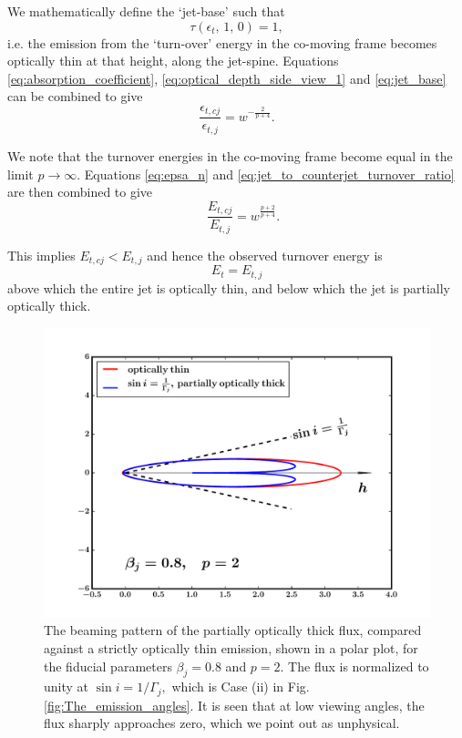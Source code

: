 We mathematically define the `jet-base' such that
\begin{equation}
\tau\left( \epsilon_{t}, \, 1, \, 0 \right) = 1, \label{eq:jet_base}
\end{equation}
i.e. the emission from the `turn-over' energy in the co-moving frame becomes optically thin at that height, along the jet-spine. Equations \ref{eq:absorption_coefficient}, \ref{eq:optical_depth_side_view_1} and \ref{eq:jet_base} can be combined to give
\begin{equation}
\frac{\epsilon_{t,cj}}{\epsilon_{t,j}} =  w^{-\frac{2}{p+4}} . \label{eq:jet_to_counterjet_turnover_ratio}
\end{equation}

We note that the turnover energies in the co-moving frame become equal in the limit $p\rightarrow\infty.$ Equations \ref{eq:epsa_n} and \ref{eq:jet_to_counterjet_turnover_ratio} are then combined
to give 
\begin{equation}
\quad\frac{E_{t,cj}}{E_{t,j}} = w^{\frac{p+2}{p+4}} . \label{eq:observed_turnover_ratio}
\end{equation}

This implies $ E_{t,cj} < E_{t,j} $ and hence the observed turnover energy is
\begin{equation}
E_{t} = E_{t,j}
\end{equation} above which the entire jet is optically thin, and below which the jet is partially optically 
thick.

\begin{figure}
\noindent \centering{}\includegraphics[scale=0.6]{beaming_initial.pdf}\caption{The beaming pattern of the partially optically thick flux, compared against a strictly optically thin emission, shown in a polar plot, for the fiducial parameters $ \beta_j = 0.8 $ and $ p = 2 . $ The flux is normalized to unity at $ \sin i = 1 / \Gamma_j , $ which is Case (ii) in Fig. \ref{fig:The_emission_angles}. It is seen that at low viewing angles, the flux sharply approaches zero, which we point out as unphysical.}
\label{fig:beaming_initial}
\end{figure}

